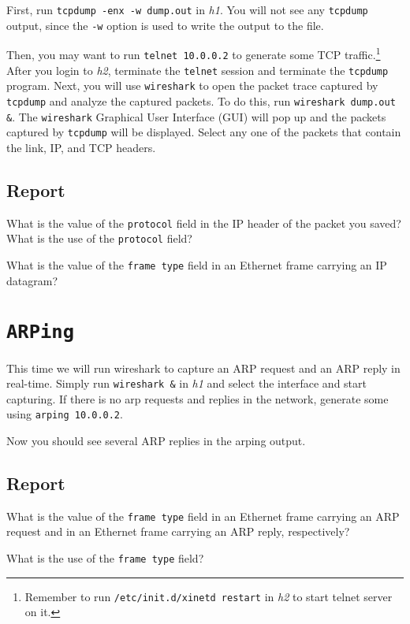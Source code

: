 \documentclass{../UTNetLab}
\begin{document}
    First, run \lstinline{tcpdump -enx -w dump.out} in \textit{h1}.
    You will not see any \lstinline{tcpdump} output, since the \lstinline{-w} option is used to write the output to the  file.

    Then, you may want to run \lstinline{telnet 10.0.0.2} to generate some TCP traffic.\footnote{Remember to run \lstinline{/etc/init.d/xinetd restart} in \textit{h2} to start telnet server on it.}
    After you login to \textit{h2}, terminate the \lstinline{telnet} session and terminate the \lstinline{tcpdump} program.
    Next, you will use \lstinline{wireshark} to open the packet trace captured by \lstinline{tcpdump} and analyze the captured packets.
    To do this, run \lstinline{wireshark dump.out &}.
    The \lstinline{wireshark} Graphical User Interface (GUI) will pop up and the packets captured by \lstinline{tcpdump} will be displayed.
    Select any one of the packets that contain the link, IP, and TCP headers.
    
    \subsection*{Report}
    What is the value of the \texttt{protocol} field in the IP header of the packet you saved?
    What is the use of the \texttt{protocol} field?

    What is the value of the \texttt{frame type} field in an Ethernet frame carrying an IP datagram?

\section{\texttt{ARPing}}
    This time we will run wireshark to capture an ARP request and an ARP reply in real-time. Simply run \lstinline{wireshark &} in \textit{h1} and select the interface and start capturing.
    If there is no arp requests and replies in the network, generate some using \lstinline{arping 10.0.0.2}.

    Now you should see several ARP replies in the arping output.
    
    \subsection*{Report}
    What is the value of the \texttt{frame type} field in an Ethernet frame carrying an ARP request and in an Ethernet frame carrying an ARP reply, respectively?

    What is the use of the \texttt{frame type} field?
\end{document}
